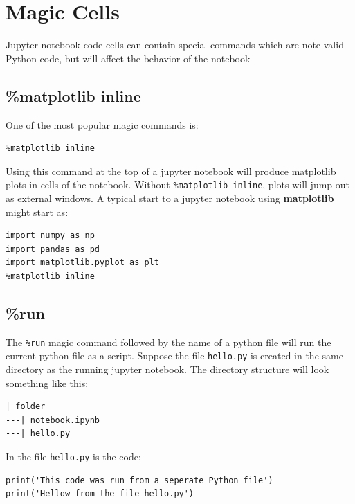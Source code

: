 \documentclass{book}
\begin{document}
    \section{Magic Cells}\label{magic-cells}

    Jupyter notebook code cells can contain special commands which are note
valid Python code, but will affect the behavior of the notebook

    \subsection{\%matplotlib inline}\label{matplotlib-inline}

    One of the most popular magic commands is:

\begin{lstlisting}
%matplotlib inline
\end{lstlisting}

Using this command at the top of a jupyter notebook will produce
matplotlib plots in cells of the notebook. Without
\lstinline!%matplotlib inline!, plots will jump out as external windows.
A typical start to a jupyter notebook using \textbf{matplotlib} might
start as:

\begin{lstlisting}
import numpy as np
import pandas as pd
import matplotlib.pyplot as plt
%matplotlib inline
\end{lstlisting}

    \subsection{\%run}\label{run}

    The \lstinline!%run! magic command followed by the name of a python file
will run the current python file as a script. Suppose the file
\lstinline!hello.py! is created in the same directory as the running
jupyter notebook. The directory structure will look something like this:

\begin{lstlisting}
| folder
---| notebook.ipynb
---| hello.py
\end{lstlisting}

In the file \lstinline!hello.py! is the code:

\begin{lstlisting}
print('This code was run from a seperate Python file')
print('Hellow from the file hello.py')
\end{lstlisting}
\end{document}
